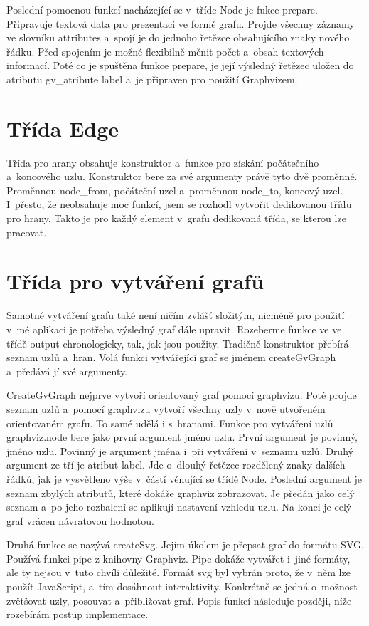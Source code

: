 \documentclass[color,table,oneside,nolot,nolof]{fithesis}
\begin{document}
	Poslední pomocnou funkcí nacházející se v~tříde Node je fukce prepare. Připravuje textová data pro prezentaci ve formě grafu. Projde všechny záznamy ve slovníku attributes a~spojí je do 
	jednoho řetězce obsahujícího znaky nového řádku. Před spojením je možné flexibilně měnit počet a~obsah textových informací. Poté co je spuštěna funkce prepare, je její výsledný řetězec
	uložen do atributu gv\_atribute label a~je připraven pro použití Graphvizem.

\section{Třída Edge}
	Třída pro hrany obsahuje konstruktor a~funkce pro získání počátečního a~koncového uzlu. Konstruktor bere za své argumenty právě tyto dvě 
	proměnné. Proměnnou node\_from, počáteční uzel a~proměnnou node\_to, koncový uzel. I~přesto, že neobsahuje moc funkcí, jsem se rozhodl vytvořit dedikovanou třídu pro hrany. 
	Takto je pro každý element v~grafu dedikovaná třída, se kterou lze pracovat.

\section{Třída pro vytváření grafů}
	Samotné vytváření grafu také není ničím zvlášť složitým, nicméně pro použití v~mé aplikaci je potřeba výsledný graf dále upravit. Rozeberme funkce ve ve třídě output chronologicky,
	tak, jak jsou použity. Tradičně konstruktor přebírá seznam uzlů a~hran. Volá funkci vytvářející graf se jménem createGvGraph a~předává jí své argumenty. 

	CreateGvGraph nejprve vytvoří orientovaný graf pomocí graphvizu. Poté projde seznam uzlů a~pomocí graphvizu vytvoří všechny uzly v~nově utvořeném orientovaném grafu. To samé udělá i
	s~hranami. Funkce pro vytváření uzlů graphviz.node bere jako první argument jméno uzlu. První argument je povinný, jméno uzlu. Povinný je argument jména
	i~při vytváření v~seznamu uzlů. Druhý argument ze tří je atribut label. Jde o~dlouhý řetězec rozdělený znaky dalších řádků, jak je vysvětleno výše v~částí věnující se třídě Node.
	Poslední argument je seznam zbylých atributů, které dokáže graphviz zobrazovat. Je předán jako celý seznam a~po jeho rozbalení se aplikují nastavení vzhledu uzlu. Na konci je celý
	graf vrácen návratovou hodnotou.

	Druhá funkce se nazývá createSvg. Jejím úkolem je přepsat graf do formátu SVG. Používá funkci pipe z knihovny Graphviz. Pipe dokáže vytvářet i~jiné formáty, ale ty nejsou v~tuto
	chvíli důležité. Formát svg byl vybrán proto, že v~něm lze použít JavaScript, a~tím dosáhnout interaktivity. Konkrétně se jedná o~možnost zvětšovat uzly, posouvat a~přibližovat graf.
	Popis funkcí následuje později, níže rozebírám postup implementace.
\end{document}

